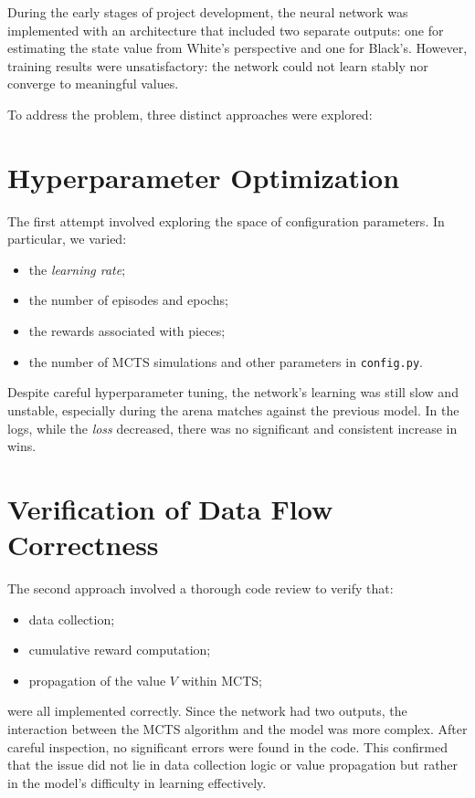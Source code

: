 \documentclass{report}
\begin{document}
During the early stages of project development, the neural network was implemented with an architecture that included two separate outputs: one for estimating the state value from White’s perspective and one for Black’s. However, training results were unsatisfactory: the network could not learn stably nor converge to meaningful values.

To address the problem, three distinct approaches were explored:

\section{Hyperparameter Optimization}
The first attempt involved exploring the space of configuration parameters. In particular, we varied:
\begin{itemize}
    \item the \textit{learning rate};
    \item the number of episodes and epochs;
    \item the rewards associated with pieces;
    \item the number of MCTS simulations and other parameters in \texttt{config.py}.
\end{itemize}
Despite careful hyperparameter tuning, the network’s learning was still slow and unstable, especially during the arena matches against the previous model. In the logs, while the \textit{loss} decreased, there was no significant and consistent increase in wins.

\section{Verification of Data Flow Correctness}
The second approach involved a thorough code review to verify that:
\begin{itemize}
    \item data collection;
    \item cumulative reward computation;
    \item propagation of the value $V$ within MCTS;
\end{itemize}
were all implemented correctly. Since the network had two outputs, the interaction between the MCTS algorithm and the model was more complex. After careful inspection, no significant errors were found in the code. This confirmed that the issue did not lie in data collection logic or value propagation but rather in the model’s difficulty in learning effectively.
\end{document}
